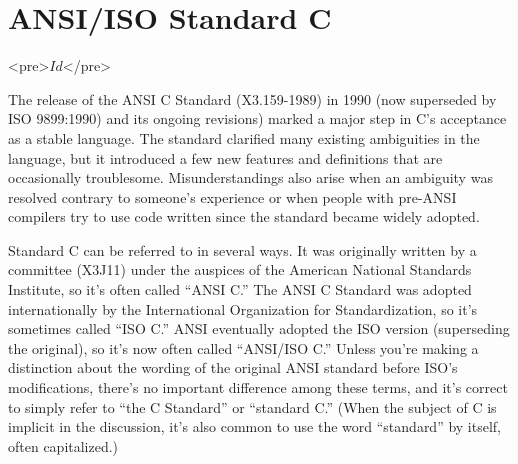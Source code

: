 \chapter{ANSI/ISO Standard C}	\label{chap:standard}

\begin{rawhtml}
<pre>$Id$</pre>
\end{rawhtml}

The release of the ANSI C Standard (X3.159-1989) in 1990 (now superseded by
ISO 9899:1990) and its ongoing revisions) marked a major step in C's
acceptance as a stable language.  The standard clarified many existing
ambiguities in the language, but it introduced a few new features and
definitions that are occasionally troublesome.  Misunderstandings also arise
when an ambiguity was resolved contrary to someone's experience or when people
with pre-ANSI compilers try to use code written since the standard became
widely adopted.

Standard C can be referred to in several ways. It was originally written by
a committee (X3J11) under the auspices of the American National Standards
Institute, so it's often called ``ANSI C.''  The ANSI C Standard was adopted
internationally by the International Organization for Standardization, so it's
sometimes called ``ISO C.''  ANSI eventually adopted the ISO version
(superseding the original), so it's now often called ``ANSI/ISO C.''
Unless you're making a distinction about the wording of the original ANSI
standard before ISO's modifications, there's no important difference among
these terms, and it's correct to simply refer to ``the C Standard'' or
``standard C.'' (When the subject of C is implicit in the discussion, it's
also common to use the word ``standard'' by itself, often capitalized.)

